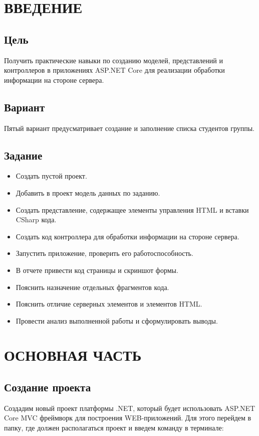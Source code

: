 \documentclass[a4paper,14pt]{extreport}
\begin{document}
	


\tableofcontents

\chapter{ВВЕДЕНИЕ}

\section{Цель}
Получить практические навыки по созданию моделей, представлений и контроллеров в приложениях ASP.NET Core для реализации обработки информации на стороне сервера.

\section{Вариант}
Пятый вариант предусматривает создание и заполнение списка студентов группы.

\section{Задание}

\begin{itemize}
	\item Создать пустой проект.
	\item Добавить в проект модель данных по заданию.
	\item Создать представление, содержащее элементы управления HTML и вставки CSharp кода.
	\item Создать код контроллера для обработки информации на стороне сервера.
	\item Запустить приложение, проверить его работоспособность.
	\item В отчете привести код страницы и скриншот формы.
	\item Пояснить назначение отдельных фрагментов кода.
	\item Пояснить отличие серверных элементов и элементов HTML.
	\item Провести анализ выполненной работы и сформулировать выводы.
\end{itemize}

\chapter{ОСНОВНАЯ ЧАСТЬ}

\section{Создание проекта}
Создадим новый проект платформы .NET, который будет использовать ASP.NET Core MVC фреймворк для построения WEB-приложений. Для этого перейдем в папку, где должен располагаться проект и введем команду в терминале:
\end{document}
